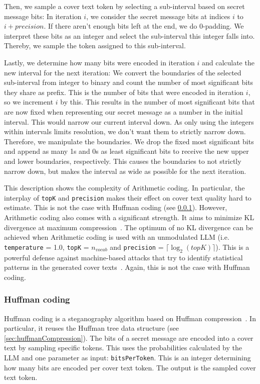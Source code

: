Then, we sample a cover text token by selecting a sub-interval based on secret message bits: In iteration $ i $, we consider the secret message bits at indices $ i $ to $ i + precision $. If there aren't enough bits left at the end, we do 0-padding. We interpret these bits as an integer and select the sub-interval this integer falls into. Thereby, we sample the token assigned to this sub-interval.

Lastly, we determine how many bits were encoded in iteration $ i $ and calculate the new interval for the next iteration: We convert the boundaries of the selected sub-interval from integer to binary and count the number of most significant bits they share as prefix. This is the number of bits that were encoded in iteration $ i $, so we increment $ i $ by this. This results in the number of most significant bits that are now fixed when representing our secret message as a number in the initial interval. This would narrow our current interval down. As only using the integers within intervals limits resolution, we don't want them to strictly narrow down. Therefore, we manipulate the boundaries. We drop the fixed most significant bits and append as many 1s and 0s as least significant bits to receive the new upper and lower boundaries, respectively. This causes the boundaries to not strictly narrow down, but makes the interval as wide as possible for the next iteration.

This description shows the complexity of Arithmetic coding. In particular, the interplay of \lstinline|topK| and \lstinline|precision| makes their effect on cover text quality hard to estimate. This is not the case with Huffman coding (see \cref{sec:huffmanCoding}). However, Arithmetic coding also comes with a significant strength. It aims to minimize \gls{KL} divergence at maximum compression~\cite{zieglerNeuralLinguisticSteganography2019}. The optimum of no \gls{KL} divergence can be achieved when Arithmetic coding is used with an unmodulated \gls{LLM} (i.e. \lstinline|temperature| = 1.0, \lstinline|topK| = $n_{vocab}$ and \lstinline|precision| = $ \lceil \log_2(topK) \rceil $). This is a powerful defense against machine-based attacks that try to identify statistical patterns in the generated cover texts~\cite{zieglerNeuralLinguisticSteganography2019}. Again, this is not the case with Huffman coding.

\subsubsection{Huffman coding}
\label{sec:huffmanCoding}
Huffman coding is a steganography algorithm based on Huffman compression~\cite{zieglerNeuralLinguisticSteganography2019,yangRNNStegaLinguisticSteganography2019}. In particular, it reuses the Huffman tree data structure (see \cref{sec:huffmanCompression}). The bits of a secret message are encoded into a cover text by sampling specific tokens. This uses the probabilities calculated by the \gls{LLM} and one parameter as input: \lstinline|bitsPerToken|. This is an integer determining how many bits are encoded per cover text token. The output is the sampled cover text token.

